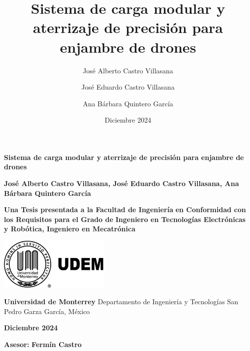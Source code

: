 \documentclass[11pt]{report} %
\title{Sistema de carga modular y aterrizaje de precisión para enjambre de drones} %
\author{José Alberto Castro Villasana \and José Eduardo Castro Villasana \and Ana Bárbara Quintero García} %
\date{Diciembre 2024} %
\begin{document}
\begin{titlepage}
    \centering
    \vspace*{1cm}
    
    {\Huge\textbf{Sistema de carga modular y aterrizaje de precisión para enjambre de drones}} %
    
    \vspace{2.5cm} %
    {\Large\textbf{José Alberto Castro Villasana, José Eduardo Castro Villasana, Ana Bárbara Quintero García}} %
    
    \vfill
    
    {\large\textbf{Una Tesis presentada a la Facultad de Ingeniería}} %
    {\large\textbf{en Conformidad con los Requisitos para el Grado de}} %
    {\large\textbf{Ingeniero en Tecnologías Electrónicas y Robótica, Ingeniero en Mecatrónica}} %
    
    \vspace{2cm}
    
    \includegraphics[width=0.4\textwidth]{pictures/logo_udem.png} %
    
    \vspace{2cm}
    
    {\large\textbf{Universidad de Monterrey} \newline Departamento de Ingeniería y Tecnologías \newline San Pedro Garza García, México} %
    
    \vspace{1.5cm}
    {\large\textbf{Diciembre 2024}} %
    
    \vfill
    
    {\large\textbf{Asesor:} \newline \textbf{Fermín Castro}} %

\end{titlepage}

\tableofcontents
\newpage

\onehalfspacing%
\end{document}
